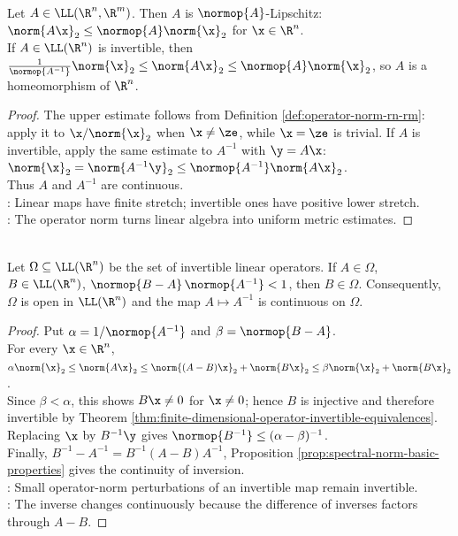 \begin{theorem} \label{thm:finite-dimensional-linear-maps-lipschitz-homeomorphisms} \\
Let $A\in\LL(\R^n,\R^m)$. Then $A$ is $\normop{A}$-Lipschitz: $\norm{A\x}_2\leq\normop{A}\norm{\x}_2$ for $\x\in\R^n$.\\
If $A\in\LL(\R^n)$ is invertible, then $\frac{1}{\normop{A^{-1}}}\norm{\x}_2\leq\norm{A\x}_2\leq\normop{A}\norm{\x}_2$, so $A$ is a homeomorphism of $\R^n$.
\begin{proof}
The upper estimate follows from Definition \ref{def:operator-norm-rn-rm}: apply it to $\x/\norm{\x}_2$ when $\x\neq\ze$, while $\x=\ze$ is trivial. If $A$ is invertible, apply the same estimate to $A^{-1}$ with $\y=A\x$: $\norm{\x}_2=\norm{A^{-1}\y}_2\leq\normop{A^{-1}}\norm{A\x}_2$.\\
Thus $A$ and $A^{-1}$ are continuous.\\
: Linear maps have finite stretch; invertible ones have positive lower stretch.\\
: The operator norm turns linear algebra into uniform metric estimates.
\end{proof}
\end{theorem}

\begin{theorem} \label{thm:invertible-operators-open-and-inversion-continuous} \\
Let $\Omega\subseteq\LL(\R^n)$ be the set of invertible linear operators. If $A\in\Omega$, $B\in\LL(\R^n)$, $\normop{B-A}\,\normop{A^{-1}}<1$, then $B\in\Omega$. Consequently, $\Omega$ is open in $\LL(\R^n)$ and the map $A\mapsto A^{-1}$ is continuous on $\Omega$.
\begin{proof}
Put $\alpha=1/\normop{A^{-1}}$ and $\beta=\normop{B-A}$.\\
For every $\x\in\R^n$, $\alpha\norm{\x}_2\leq \norm{A\x}_2 \leq \norm{(A-B)\x}_2+\norm{B\x}_2 \leq \beta\norm{\x}_2+\norm{B\x}_2$.\\
Since $\beta<\alpha$, this shows $B\x\neq0$ for $\x\neq0$; hence $B$ is injective and therefore invertible by Theorem \ref{thm:finite-dimensional-operator-invertible-equivalences}.\\
Replacing $\x$ by $B^{-1}\y$ gives $\normop{B^{-1}}\leq(\alpha-\beta)^{-1}$.\\
Finally, $B^{-1}-A^{-1}=B^{-1}(A-B)A^{-1}$, Proposition \ref{prop:spectral-norm-basic-properties} gives the continuity of inversion.\\
: Small operator-norm perturbations of an invertible map remain invertible.\\
: The inverse changes continuously because the difference of inverses factors through $A-B$.
\end{proof}
\end{theorem}

